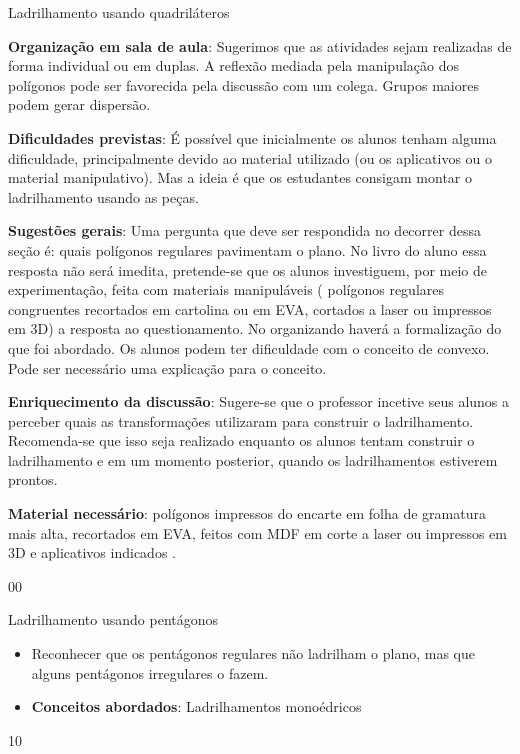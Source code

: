 \begin{sugestions}{Ladrilhamento usando quadriláteros}
{
\textbf{Organização em sala de aula}: Sugerimos que as atividades sejam realizadas de forma individual ou em duplas. A reflexão mediada pela manipulação dos polígonos pode ser favorecida pela discussão com um colega. Grupos maiores podem gerar dispersão.

\textbf{Dificuldades previstas}: É possível que inicialmente os alunos tenham alguma dificuldade, principalmente devido ao material utilizado (ou os aplicativos ou o material manipulativo). Mas a ideia é que os estudantes consigam montar o ladrilhamento usando as peças. 

\textbf{Sugestões gerais}: Uma pergunta que deve ser respondida no decorrer dessa seção é: quais polígonos regulares pavimentam o plano. No livro do aluno essa resposta não será imedita, pretende-se que os alunos investiguem, por meio de experimentação, feita com materiais manipuláveis ( polígonos regulares congruentes recortados em cartolina ou em EVA, cortados a laser ou impressos em 3D) a resposta ao questionamento. No organizando haverá a formalização do que foi abordado.  Os alunos podem ter dificuldade com o conceito de convexo. Pode ser necessário uma explicação para o conceito. 

\textbf{Enriquecimento da discussão}: Sugere-se que o professor incetive seus alunos a perceber quais as transformações utilizaram para construir o ladrilhamento. Recomenda-se que isso seja realizado enquanto os alunos tentam construir o ladrilhamento e em um momento posterior, quando os ladrilhamentos estiverem prontos.

\textbf{Material necessário}: polígonos impressos do encarte em folha de gramatura mais alta, recortados em EVA, feitos com MDF em corte a laser ou impressos em 3D e aplicativos indicados .
}{0}{0}
\end{sugestions}
\begin{objectives}{Ladrilhamento usando pentágonos}
{
\begin{itemize}
\item Reconhecer que os pentágonos regulares não ladrilham o plano, mas que alguns pentágonos irregulares o fazem.
\item \textbf{Conceitos abordados}: Ladrilhamentos monoédricos
\end{itemize}
}{1}{0}
\end{objectives}


